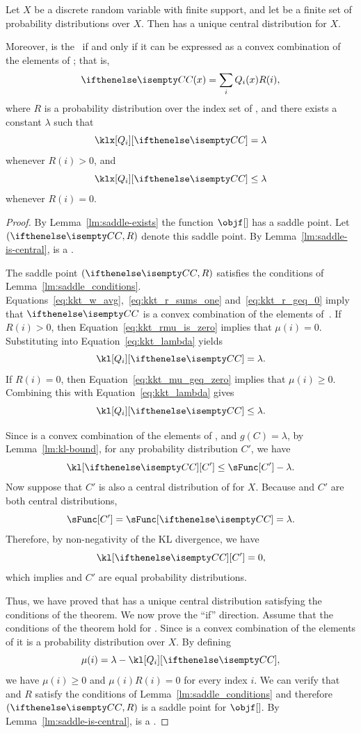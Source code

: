 \begin{theorem}[Centrality]
    \label{th:centrality}
    Let $X$ be a discrete random variable with finite support, and let \setQ be a finite set of probability
    distributions over $X$.
    Then \setQ has a unique central distribution for $X$.

    Moreover, \cDist is the \cd\ if and only if it can be expressed as a convex combination of the elements
    of \setQ; that is,
    \[
        \combination{\cDist},
    \]
    where $R$ is a probability distribution over the index set of \setQ,
    and there exists a constant $\lambda$ such that
    \begin{equation*}
        \klx[Q_i][\cDist] = \lambda
    \end{equation*}
    whenever $R(i) > 0$, and
    \[
        \klx[Q_i][\cDist] \leq \lambda
    \]
    whenever $R(i) = 0$.
\end{theorem}

\begin{proof}
    By Lemma~\ref{lm:saddle-exists} the function $\objf[]$ has a saddle point.
    Let $(\cDist, R)$ denote this saddle point.
    By Lemma~\ref{lm:saddle-is-central}, \cDist is a \cd.

    The saddle point $(\cDist,R)$ satisfies the conditions of Lemma~\ref{lm:saddle_conditions}.
    Equations~\ref{eq:kkt_w_avg},~\ref{eq:kkt_r_sums_one} and~\ref{eq:kkt_r_geq_0} imply that $\cDist$ is a convex
    combination of the elements of~\setQ.
    If $R(i) > 0$, then Equation~\ref{eq:kkt_rmu_is_zero} implies that $\mu(i) = 0$.
    Substituting into Equation~\ref{eq:kkt_lambda} yields
    \[
        \kl[Q_i][\cDist] = \lambda.
    \]
    If $R(i) = 0$, then Equation~\ref{eq:kkt_mu_geq_zero} implies that $\mu(i) \geq 0$.
    Combining this with Equation~\ref{eq:kkt_lambda} gives
    \[
        \kl[Q_i][\cDist] \leq \lambda.
    \]

    Since \cDist is a convex combination of the elements of \setQ, and $g(C) = \lambda$, by Lemma~\ref{lm:kl-bound},
    for any probability distribution $C'$, we have
    \[
        \kl[\cDist][C'] \leq \sFunc[C'] - \lambda.
    \]
    Now suppose that $C'$ is also a central distribution of \setQ for $X$.
    Because \cDist and $C'$ are both central distributions,
    \[
        \sFunc[C'] = \sFunc[\cDist] = \lambda.
    \]
    Therefore, by non-negativity of the KL divergence, we have
    \[
        \kl[\cDist][C'] = 0,
    \]
    which implies \cDist and $C'$ are equal probability distributions.

    Thus, we have proved that \setQ has a unique central distribution satisfying the conditions of the theorem.
    We now prove the ``if'' direction.
    Assume that the conditions of the theorem hold for \cDist.
    Since \cDist is a convex combination of the elements of \setQ it is a probability distribution over $X$.
    By defining
    \[
        \mu(i) = \lambda - \kl[Q_i][\cDist],
    \]
    we have $\mu(i) \geq 0$ and $\mu(i)R(i) = 0$ for every index $i$.
    We can verify that \cDist and $R$ satisfy the conditions of Lemma~\ref{lm:saddle_conditions} and therefore
    $\left( \cDist, R \right)$ is a saddle point for $\objf[]$.
    By Lemma~\ref{lm:saddle-is-central}, \cDist is a \cd.
\end{proof}

